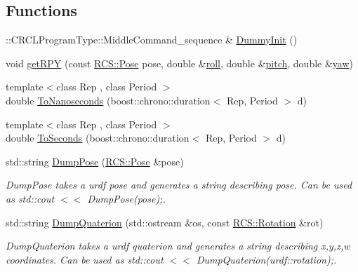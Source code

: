 \subsection*{Functions}
\begin{DoxyCompactItemize}
\item 
\-::C\-R\-C\-L\-Program\-Type\-::\-Middle\-Command\-\_\-sequence \& \hyperlink{namespaceRCS_a0d81b5ae27814995884c1d25619db28a}{Dummy\-Init} ()
\item 
void \hyperlink{namespaceRCS_a6e911197b35a4857f179af61811d4b0a}{get\-R\-P\-Y} (const \hyperlink{namespaceRCS_aa07e45d8a50e30064283d2b38087f999}{R\-C\-S\-::\-Pose} pose, double \&\hyperlink{SanityCheckTests_8cpp_a1d3228afa3a1d6773954f40c1e519eb9}{roll}, double \&\hyperlink{SanityCheckTests_8cpp_a34c057a0378030db67bd6a129f37d938}{pitch}, double \&\hyperlink{SanityCheckTests_8cpp_a21cd490f6191f66678f55b4c242a10cf}{yaw})
\item 
{\footnotesize template$<$class Rep , class Period $>$ }\\double \hyperlink{namespaceRCS_a1d588bfecc6b5d8e671ad9c57d18ecdc}{To\-Nanoseconds} (boost\-::chrono\-::duration$<$ Rep, Period $>$ d)
\item 
{\footnotesize template$<$class Rep , class Period $>$ }\\double \hyperlink{namespaceRCS_a82f7cfa7edd613a454281ce5f5685b4d}{To\-Seconds} (boost\-::chrono\-::duration$<$ Rep, Period $>$ d)
\item 
std\-::string \hyperlink{namespaceRCS_a35eaff1f2c8ec5520f595d6f3b2d38b3}{Dump\-Pose} (\hyperlink{namespaceRCS_aa07e45d8a50e30064283d2b38087f999}{R\-C\-S\-::\-Pose} \&pose)
\begin{DoxyCompactList}\small\item\em Dump\-Pose takes a urdf pose and generates a string describing pose. Can be used as std\-::cout $<$$<$ Dump\-Pose(pose);. \end{DoxyCompactList}\item 
std\-::string \hyperlink{namespaceRCS_a994378d2744371f1afac4b59a808fef2}{Dump\-Quaterion} (std\-::ostream \&os, const \hyperlink{namespaceRCS_a3fd915276fdb632d217c560523c320e0}{R\-C\-S\-::\-Rotation} \&rot)
\begin{DoxyCompactList}\small\item\em Dump\-Quaterion takes a urdf quaterion and generates a string describing x,y,z,w coordinates. Can be used as std\-::cout $<$$<$ Dump\-Quaterion(urdf\-::rotation);. \end{DoxyCompactList}\end{DoxyCompactItemize}
